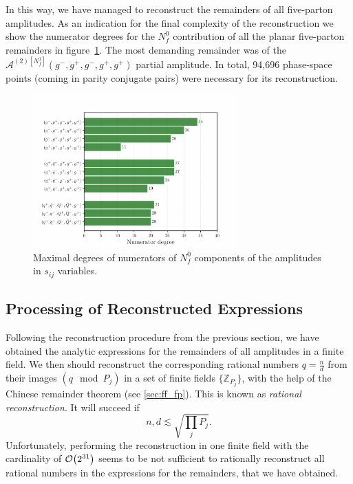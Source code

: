 In this way, we have managed to reconstruct the remainders of all five-parton amplitudes.
As an indication for the final complexity of the reconstruction we show the
numerator degrees for the $N_f^0$ contribution of all the planar five-parton
remainders in figure~\ref{fig:degrees-all}.
The most demanding remainder was of the $\mathcal{A}^{(2)[N_f^1]}(g^-,g^+,g^-,g^+,g^+)$ partial amplitude.
In total, 94,696 phase-space points  (coming in parity conjugate pairs) were necessary for its reconstruction.

\begin{figure}[ht]
  \centering
  \includegraphics[width = 0.7\textwidth]{plots/plot_sijs.pdf}
  \caption{Maximal degrees of numerators of $N_f^0$ components of the amplitudes in $s_{ij}$ variables.}
  \label{fig:degrees-all}
\end{figure}



\subsection{Processing of Reconstructed Expressions}

Following the reconstruction procedure from the previous section, we have obtained the analytic expressions
for the remainders of all amplitudes in a finite field.
We then should reconstruct the corresponding rational numbers $q=\frac{n}{d}$ from
their images $(q \mod P_j)$ in a set of finite fields $\{\mathbb{Z}_{P_j}\}$, 
with the help of the Chinese remainder theorem (see \cref{sec:ff_fp}).
This is known as \emph{rational reconstruction}.
It will succeed if 
\begin{equation} \label{eq:condition_rat_reconstruct}
  n,d \lesssim \sqrt{\prod_jP_j}.
\end{equation}
Unfortunately, performing the reconstruction in one finite field with the cardinality of $\order{2^{31}}$ 
seems to be not sufficient to rationally reconstruct all rational numbers in the expressions for the remainders, that we have obtained.

